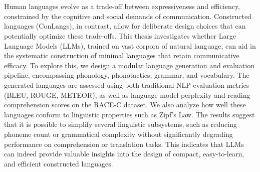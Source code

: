 \chapter{\abstractname}

Human languages evolve as a trade-off between expressiveness and efficiency, constrained by the cognitive and social demands of communication. 
Constructed languages (ConLangs), in contrast, allow for deliberate design choices that can potentially optimize these trade-offs. This thesis 
investigates whether Large Language Models (LLMs), trained on vast corpora of natural language, can aid in the systematic construction of minimal 
languages that retain communicative efficacy. To explore this, we design a modular language generation and evaluation pipeline, encompassing 
phonology, phonotactics, grammar, and vocabulary. The generated languages are assessed using both traditional NLP evaluation metrics (BLEU, ROUGE, METEOR), 
as well as language model perplexity and reading comprehension scores on the RACE-C dataset. We also analyze how well these languages conform to linguistic 
properties such as Zipf's Law. The results suggest that it is possible to simplify several linguistic subsystems, such as reducing phoneme count or 
grammatical complexity without significantly degrading performance on comprehension or translation tasks. This indicates that LLMs can indeed 
provide valuable insights into the design of compact, easy-to-learn, and efficient constructed languages.